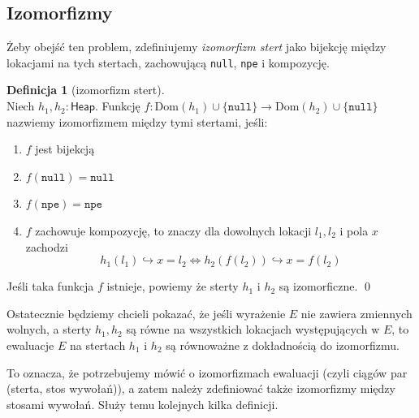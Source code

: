 \documentclass[]{pracamgr}
\renewcommand \| {\hspace{0.75em} | \hspace{0.75em} }
\renewcommand \[ {[\![}
\renewcommand \] {]\!]}
\theoremstyle{definition}
\newtheorem{definition}{Definicja}[section]
\begin{document}
\subsection{Izomorfizmy}

Żeby obejść ten problem, zdefiniujemy \textit{izomorfizm stert} jako bijekcję między lokacjami
na tych stertach,
zachowującą \texttt{null}, \texttt{npe} i kompozycję.

\begin{definition}[izomorfizm stert] {\ } \\
Niech $h_1, h_2 : \mathsf{Heap}$.
Funkcję $f : \mathrm{Dom}(h_1) \cup \{\mathtt{null}\} \to \mathrm{Dom}(h_2) \cup \{\mathtt{null}\}$
nazwiemy izomorfizmem między tymi stertami, jeśli:
\begin{enumerate}
 \item $f$ jest bijekcją
 \item $f(\mathtt{null}) = \mathtt{null}$
 \item $f(\mathtt{npe}) = \mathtt{npe}$
 \item $f$ zachowuje kompozycję, to znaczy dla dowolnych lokacji $l_1, l_2$ i pola $x$ zachodzi
    $$h_1(l_1) \hookrightarrow x = l_2 \iff h_2(f(l_2)) \hookrightarrow x = f(l_2)$$
\end{enumerate}
Jeśli taka funkcja $f$ istnieje, powiemy że sterty $h_1$ i $h_2$ są izomorficzne.
\qed
\end{definition}

Ostatecznie będziemy chcieli pokazać, że jeśli wyrażenie $E$ nie zawiera zmiennych wolnych,
a sterty $h_1, h_2$ są równe na wszystkich lokacjach występujących w $E$, to
ewaluacje $E$ na stertach $h_1$ i $h_2$ są równoważne z dokładnością do izomorfizmu.

To oznacza, że potrzebujemy mówić o izomorfizmach ewaluacji (czyli ciągów par (sterta, stos wywołań)),
a zatem należy zdefiniować także izomorfizmy między stosami wywołań.
Służy temu kolejnych kilka definicji.
\end{document}
